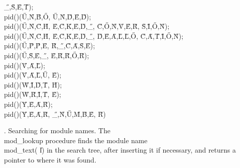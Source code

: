 \H{\_}\?,\?\H{S}\?,\?\H{E}\?,\?\H{T}\?\2)\?;\6
\\{pid}\?\1(\?\2)\1(\?\H{U}\?,\?\H{N}\?,\?\H{B}\?,\?\H{O}\?,\?%
\H{U}\?,\?\H{N}\?,\?\H{D}\?,\?\H{E}\?,\?\H{D}\?\2)\?;\6
\\{pid}\?\1(\?\2)\1(\?\H{U}\?,\?\H{N}\?,\?\H{C}\?,\?\H{H}\?,\?%
\H{E}\?,\?\H{C}\?,\?\H{K}\?,\?\H{E}\?,\?\H{D}\?,\?\H{\_}\?,\?%
\H{C}\?,\?\H{O}\?,\?\H{N}\?,\?\H{V}\?,\?\H{E}\?,\?\H{R}\?,\?%
\H{S}\?,\?\H{I}\?,\?\H{O}\?,\?\H{N}\?\2)\?;\6
\\{pid}\?\1(\?\2)\1(\?\H{U}\?,\?\H{N}\?,\?\H{C}\?,\?\H{H}\?,\?%
\H{E}\?,\?\H{C}\?,\?\H{K}\?,\?\H{E}\?,\?\H{D}\?,\?\H{\_}\?,\?%
\H{D}\?,\?\H{E}\?,\?\H{A}\?,\?\H{L}\?,\?\H{L}\?,\?\H{O}\?,\?%
\H{C}\?,\?\H{A}\?,\?\H{T}\?,\?\H{I}\?,\?\H{O}\?,\?\H{N}\?\2)\?;\6
\\{pid}\?\1(\?\2)\1(\?\H{U}\?,\?\H{P}\?,\?\H{P}\?,\?\H{E}\?,\?%
\H{R}\?,\?\H{\_}\?,\?\H{C}\?,\?\H{A}\?,\?\H{S}\?,\?\H{E}\?\2)\?;%
\6
\\{pid}\?\1(\?\2)\1(\?\H{U}\?,\?\H{S}\?,\?\H{E}\?,\?\H{\_}\?,\?%
\H{E}\?,\?\H{R}\?,\?\H{R}\?,\?\H{O}\?,\?\H{R}\?\2)\?;\6
\\{pid}\?\1(\?\2)\1(\?\H{V}\?,\?\H{A}\?,\?\H{L}\?\2)\?;\6
\\{pid}\?\1(\?\2)\1(\?\H{V}\?,\?\H{A}\?,\?\H{L}\?,\?\H{U}\?,\?%
\H{E}\?\2)\?;\6
\\{pid}\?\1(\?\2)\1(\?\H{W}\?,\?\H{I}\?,\?\H{D}\?,\?\H{T}\?,\?%
\H{H}\?\2)\?;\6
\\{pid}\?\1(\?\2)\1(\?\H{W}\?,\?\H{R}\?,\?\H{I}\?,\?\H{T}\?,\?%
\H{E}\?\2)\?;\6
\\{pid}\?\1(\?\2)\1(\?\H{Y}\?,\?\H{E}\?,\?\H{A}\?,\?\H{R}\?\2)\?;\6
\\{pid}\?\1(\?\2)\1(\?\H{Y}\?,\?\H{E}\?,\?\H{A}\?,\?\H{R}\?,\?%
\H{\_}\?,\?\H{N}\?,\?\H{U}\?,\?\H{M}\?,\?\H{B}\?,\?\H{E}\?,\?%
\H{R}\?\2)\?\par
\fi

.  Searching for module names.
The \\{mod\_lookup} procedure finds the module name \\{mod\_text}\?(\?\to\?%
\|l\?)\? in the
search tree, after inserting it if necessary, and returns a pointer to
where it was found.

